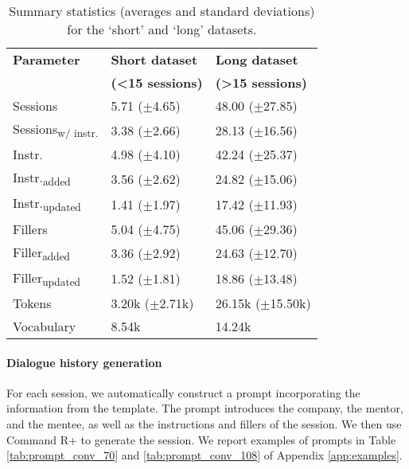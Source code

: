\begin{table}[]
    \centering
    \begin{tabularx}{1\columnwidth}{Xll}
    \toprule
    \textbf{Parameter}  & \textbf{Short dataset} & \textbf{Long dataset} \\
    & \textbf{(<15 sessions)} &  \textbf{(>15 sessions)} \\
    \midrule
    Sessions             & \normalsize{5.71} \scriptsize{($\pm$4.65)}            & \normalsize{48.00} \scriptsize{($\pm$27.85)}         \\
    Sessions\textsubscript{w/ instr.} & \normalsize{3.38} \scriptsize{($\pm$2.66)}            & \normalsize{28.13} \scriptsize{($\pm$16.56)}         \\
    Instr.               & \normalsize{4.98} \scriptsize{($\pm$4.10)}            & \normalsize{42.24} \scriptsize{($\pm$25.37)}         \\
    Instr.\textsubscript{added}           & \normalsize{3.56} \scriptsize{($\pm$2.62)}            & \normalsize{24.82} \scriptsize{($\pm$15.06)}         \\
    Instr.\textsubscript{updated}        & \normalsize{1.41} \scriptsize{($\pm$1.97)}            & \normalsize{17.42} \scriptsize{($\pm$11.93)}         \\
    Fillers              & \normalsize{5.04} \scriptsize{($\pm$4.75)}            & \normalsize{45.06} \scriptsize{($\pm$29.36)}         \\
    Filler\textsubscript{added}          & \normalsize{3.36} \scriptsize{($\pm$2.92)}            & \normalsize{24.63} \scriptsize{($\pm$12.70)}         \\
    Filler\textsubscript{updated}       & \normalsize{1.52} \scriptsize{($\pm$1.81)}            & \normalsize{18.86} \scriptsize{($\pm$13.48)}         \\
    Tokens         & \normalsize{3.20k} \scriptsize{($\pm$2.71k)}            & \normalsize{26.15k} \scriptsize{($\pm$15.50k)}         \\
    Vocabulary           & \normalsize{8.54k}                                    & \normalsize{14.24k}                                  \\
    \bottomrule
    \end{tabularx}
    \caption{Summary statistics (averages and standard deviations) for the `short' and `long' datasets.}
    \label{tab:dataset_statistics}
\end{table}


\paragraph{Dialogue history generation} For each session, we automatically construct a prompt incorporating the information from the template. The prompt introduces the company, the mentor, and the mentee, as well as the instructions and fillers of the session. We then use Command R+ \citep{cohere2024} to generate the session. We report examples of prompts in Table \ref{tab:prompt_conv_70} and \ref{tab:prompt_conv_108} of Appendix \ref{app:examples}. 

